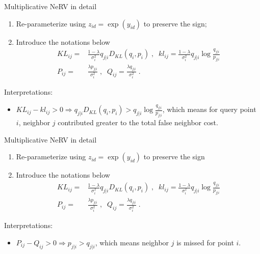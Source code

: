 \documentclass[first=dgreen,second=purple,logo=yellowexc]{aaltoslides}
\begin{document}
\begin{frame}{Multiplicative NeRV in detail}
\begin{enumerate}
\item Re-parameterize using $z_{id}=\exp(y_{id})$ to preserve the sign;
\item Introduce the notations below
\begin{align*}
KL_{ij}=&\frac{1-\lambda}{\sigma_i^2}q_{j|i}D_{KL}(q_i,p_i)\;,\;\;kl_{ij}=\frac{1-\lambda}{\sigma_i^2}q_{j|i}\log\frac{q_{j|i}}{p_{j|i}}\\
P_{ij}=&\frac{\lambda p_{j|i}}{\sigma_i^2}\;,\;\;Q_{ij}=\frac{\lambda q_{j|i}}{\sigma_i^2} \;.
\end{align*}
\end{enumerate}
Interpretations:
\begin{itemize}
\item 
$KL_{ij}-kl_{ij}>0 \Longrightarrow q_{j|i}D_{KL}(q_i,p_i)>q_{j|i}\log\frac{q_{j|i}}{p_{j|i}}$, which means for query point $i$, neighbor $j$ contributed greater to the total false neighbor cost.

\end{itemize}
\end{frame}


\begin{frame}{Multiplicative NeRV in detail}
\begin{enumerate}
\item Re-parameterize using $z_{id}=\exp(y_{id})$ to preserve the sign
\item Introduce the notations below
\begin{align*}
KL_{ij}=&\frac{1-\lambda}{\sigma_i^2}q_{j|i}D_{KL}(q_i,p_i)\;,\;\;kl_{ij}=\frac{1-\lambda}{\sigma_i^2}q_{j|i}\log\frac{q_{j|i}}{p_{j|i}}\\
P_{ij}=&\frac{\lambda p_{j|i}}{\sigma_i^2}\;,\;\;Q_{ij}=\frac{\lambda q_{j|i}}{\sigma_i^2} \;.
\end{align*}
\end{enumerate}

Interpretations:
\begin{itemize}
\item $P_{ij}-Q_{ij}>0 \Longrightarrow p_{j|i}>q_{j|i}$, which means neighbor $j$ is missed for point $i$.

\end{itemize}
\end{frame}
\end{document}
